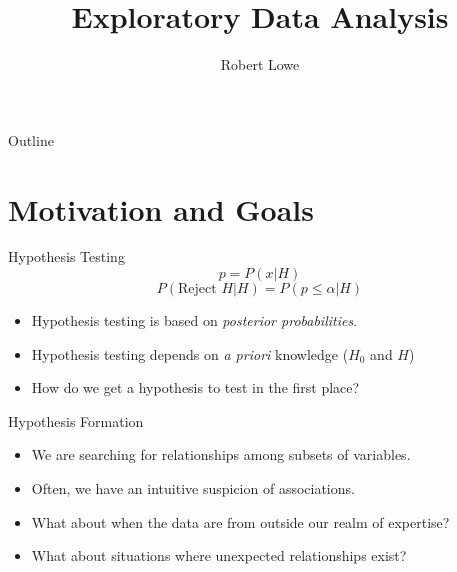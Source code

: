 \documentclass[handout]{beamer}
\title{Exploratory Data Analysis}
\author{Robert Lowe\\}
\institute[Maryville College] %
{
  Division of Mathematics and Computer Science\\
  Maryville College
}
\date[]{}
\begin{document}
\begin{frame}
  \titlepage
\end{frame}

\begin{frame}{Outline}
  \tableofcontents
\end{frame}





\section{Motivation and Goals}
\begin{frame}{Hypothesis Testing}
\[
p = P(x | H)
\]
\[
   P(\textrm{Reject } H | H) = P(p \leq \alpha | H)
\]
\begin{itemize}[<+->]
   \item Hypothesis testing is based on {\em posterior probabilities}.
   \item Hypothesis testing depends on {\em a priori} knowledge ($H_0$ and $H$)
   \item How do we get a hypothesis to test in the first place?
\end{itemize}
\end{frame}

\begin{frame}{Hypothesis Formation}
\begin{itemize}[<+->]
   \item We are searching for relationships among subsets of variables.
   \item Often, we have an intuitive suspicion of associations.
   \item What about when the data are from outside our realm of expertise?
   \item What about situations where unexpected relationships exist?
\end{itemize}
\end{frame}
\end{document}
